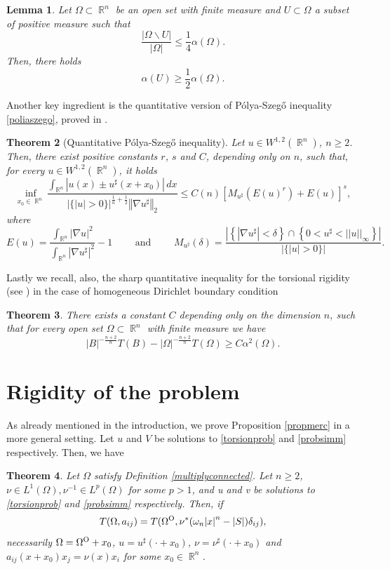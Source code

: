 \documentclass[oneside,a4paper,11pt,notitlepage]{article}
\newcommand{\abs}[1]{{\left|#1\right|}}
\newcommand{\norma}[1]{{\left\Vert#1\right\Vert}}
\theoremstyle{definition}
\theoremstyle{plain}
\newtheorem{theorem}{Theorem}[section]
\newtheorem{lemma}[theorem]{Lemma}
\theoremstyle{definition}
\DeclareMathOperator{\R}{\mathbb{R}}
\newcommand{\OO}{\text{\normalfont  O}}
\begin{document}
\begin{lemma}\label{propasi}
    Let $\Omega\subset\R^n$ be an open set with finite measure and $U\subset\Omega$ a subset of positive measure such that \[\frac{|\Omega\backslash U|}{|\Omega|}\leq\frac{1}{4}\alpha(\Omega).\]
    Then, there holds \[\alpha(U)\geq\frac{1}{2}\alpha(\Omega).\]
\end{lemma}
Another key ingredient is the quantitative version of P\'olya-Szeg\H o
inequality \eqref{poliaszego}, proved in \cite{CFET}.
\begin{theorem}[Quantitative P\'olya-Szeg\H o
inequality]
\label{polya_quant}
    Let $u\in W^{1,2}(\R^n)$, $n\geq 2$. Then, there exist  positive constants $r$, $s$ and $C$, depending only on $n$,  such that, for every $u\in W^{1,2}(\R^n)$, it holds
\begin{equation*}
   \inf_{x_0 \in \R^n} \dfrac{\displaystyle{\int_{\R^n} \abs{u(x)\pm u^\sharp(x+x_0)} \, dx }}{\abs{\{\abs{u}>0\}}^{\frac{1}{n}+\frac{1}{2}}\norma{\nabla u^\sharp}_2}\leq C(n) \left[M_{u^\sharp}(E(u)^r)+E(u)\right]^s,
\end{equation*}
where 
\begin{equation}\label{eumu}
E(u)= \frac{\displaystyle{\int_{\R^n} \abs{\nabla u}^2}}{\displaystyle{\int_{\R^n} |\nabla u^{\sharp}|^2}}-1 \qquad \text{ and } \qquad M_{u^\sharp}(\delta)=\dfrac{\abs{\left\{|\nabla u^{\sharp}|<\delta\right\}\cap \left\{0<u^\sharp<||u||_\infty\right\}}}{\abs{\{\abs{u}>0\}}}.
\end{equation}
\end{theorem}
Lastly we recall, also, the sharp quantitative inequality for the torsional rigidity (see \cite{BDV}) in the case of homogeneous Dirichlet boundary condition
\begin{theorem}
    There exists a constant $C$ depending only on the dimension $n$, such that for every open set $\Omega\subset\R^n$ with finite measure we have
    \[\abs{B}^{-\frac{n+2}{n}}T(B)-\abs{\Omega}^{-\frac{n+2}{n}}T(\Omega)\geq C\alpha^2(\Omega).\]
\end{theorem}
\section{ Rigidity of the problem}\label{section3}
As already mentioned in the introduction, we prove Proposition \ref{propmerc} in a more general setting. Let $u$ and $V$ be solutions to \eqref{torsionprob} and \eqref{probsimm} respectively. Then, we have

\begin{theorem}\label{teorig}
Let $\Omega$ satisfy Definition \ref{multiplyconnected}. Let $n\geq 2$,  $\nu\in L^1(\Omega),\nu^{-1}\in L^p(\Omega)$ for some $p>1$, and u and v  be  solutions to \eqref{torsionprob} and \eqref{probsimm} respectively. Then, if 
 $$T(\Omega,a_{ij})=T(\Omega^\OO,\nu^*(\omega_n\abs{x}^n-\abs{S})\delta_{ij}),$$
 necessarily $\Omega= \Omega^\OO+ x_0$, $u=u^\sharp(\cdot +x_0)$, $\nu=\nu^\sharp(\cdot +x_0)$  and $a_{ij}(x+x_0)x_j=\nu(x)x_i$ for some $x_0 \in \R^n$.
\end{theorem}
\end{document}
